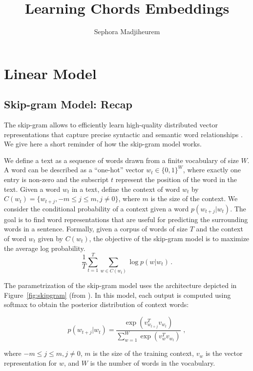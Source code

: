 \documentclass[12pt]{article}\pagestyle{myheadings}
\title{Learning Chords Embeddings}
\author{Sephora Madjiheurem}
\begin{document}
\maketitle

\section{Linear Model}
\subsection{Skip-gram Model: Recap}

The skip-gram allows to efficiently learn high-quality distributed vector representations that capture precise syntactic and semantic word relationships \citep{mik2013}. We give here a short reminder of how the skip-gram model works.

We define a text as a sequence of words drawn from a finite vocabulary of size $W$. A word can be described as a ``one-hot'' vector $w_t \in \{0,1\}^W$, where exactly one entry is non-zero and the subscript $t$ represent the position of the word in the text.  
Given a  word $w_t$ in a text, define the context of word $w_t$ by $ C(w_t) = \{w_{t+j}, -m \leq j \leq m , j \neq 0\}$, where $m$ is the size of the context. We consider the conditional probability of a context given a word  $p(w_{t+j}|w_t)$.  The goal is to find word representations that are useful for predicting the surrounding words in a sentence. Formally, given a corpus of words of size $T$ and the context of word $w_t$ given by $C(w_t)$, the objective of the skip-gram model is to maximize the average log probability. 
\begin{equation}
\frac{1}{T} \sum_{t=1}^T \sum_{w \in C(w_t)} \log p(w|w_t)\,.
\label{eq:skipgram_obj}
\end{equation}

The parametrization of the skip-gram model uses the architecture depicted in Figure~\ref{fig:skipgram} (from \citet{mik2013}). In this model, each output is computed using softmax to obtain the posterior distribution of context words:

\begin{equation}
p(w_{t+j}|w_t) = \frac{ \exp (v_{w_{t+j}}^T v_{w_t})}{\sum_{w=1}^W \exp (v_{w}^T v_{w_t})} \,\,,
\end{equation}

where $-m \leq j \leq m, j\neq 0$, $m$ is the size of the training context,  $v_w$ is the vector representation for $w$, and $W$ is the number of words in the vocabulary.
\end{document}
